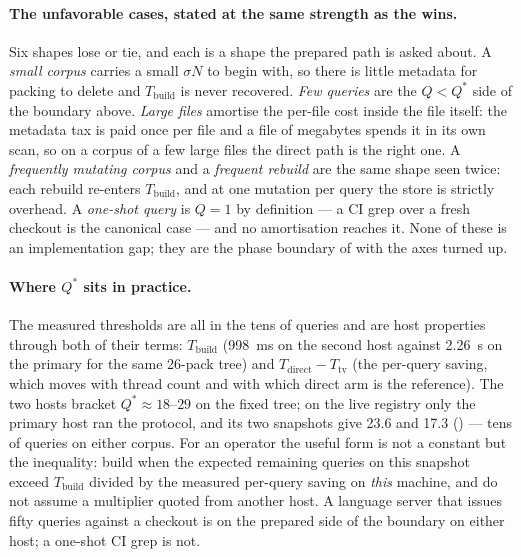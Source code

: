 \documentclass[11pt,letterpaper]{article}
\begin{document}
\paragraph{The unfavorable cases, stated at the same strength as the wins.}
Six shapes lose or tie, and each is a shape the prepared path is asked
about. A \emph{small corpus} carries a small $\sigma N$ to begin with, so
there is little metadata for packing to delete and $T_{\text{build}}$ is
never recovered. \emph{Few queries} are the $Q<Q^{*}$ side of the boundary
above. \emph{Large files} amortise the per-file cost inside the file
itself: the metadata tax is paid once per file and a file of megabytes
spends it in its own scan, so on a corpus of a few large files the direct
path is the right one. A \emph{frequently mutating corpus} and a
\emph{frequent rebuild} are the same shape seen twice: each rebuild
re-enters $T_{\text{build}}$, and at one mutation per query the store is
strictly overhead. A \emph{one-shot query} is $Q=1$ by definition --- a CI
grep over a fresh checkout is the canonical case --- and no amortisation
reaches it. None of these is an implementation gap; they are the phase
boundary of  with the axes turned up.

\paragraph{Where $Q^{*}$ sits in practice.}
The measured thresholds are all in the tens of queries and are host
properties through both of their terms: $T_{\text{build}}$ (998~ms on the
second host against 2.26~s on the primary for the same 26-pack tree) and
$T_{\text{direct}}-T_{\text{tv}}$ (the per-query saving, which moves with
thread count and with which direct arm is the reference). The two hosts
bracket $Q^{*}\approx 18$--$29$ on the fixed tree; on the live registry
only the primary host ran the protocol, and its two snapshots give 23.6 and
17.3 () --- tens of queries on either corpus. For an
operator the useful form is
not a constant but the inequality: build when the expected remaining
queries on this snapshot exceed $T_{\text{build}}$ divided by the measured
per-query saving on \emph{this} machine, and do not assume a multiplier
quoted from another host. A language server that issues fifty queries
against a checkout is on the prepared side of the boundary on either
host; a one-shot CI grep is not.
\end{document}

